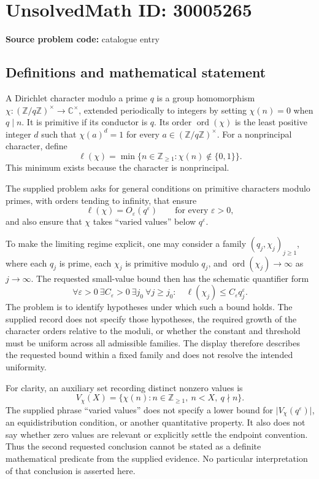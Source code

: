 \documentclass[11pt]{article}
\newcommand{\Z}{\mathbb{Z}}
\newcommand{\C}{\mathbb{C}}
\begin{document}
\section*{UnsolvedMath ID: 30005265}
\textbf{Source problem code:} catalogue entry
\subsection{Definitions and mathematical statement}
A Dirichlet character modulo a prime \(q\) is a group homomorphism \(\chi:(\Z/q\Z)^\times\to\C^\times\), extended periodically to integers by setting \(\chi(n)=0\) when \(q\mid n\). It is primitive if its conductor is \(q\). Its order \(\operatorname{ord}(\chi)\) is the least positive integer \(d\) such that \(\chi(a)^d=1\) for every \(a\in(\Z/q\Z)^\times\). For a nonprincipal character, define
\[
\ell(\chi)=\min\{n\in\Z_{\geq1}:\chi(n)\notin\{0,1\}\}.
\]
This minimum exists because the character is nonprincipal.

The supplied problem asks for general conditions on primitive characters modulo primes, with orders tending to infinity, that ensure
\[
\ell(\chi)=O_{\varepsilon}(q^{\varepsilon})
\qquad\text{for every }\varepsilon>0,
\]
and also ensure that \(\chi\) takes ``varied values'' below \(q^{\varepsilon}\).

To make the limiting regime explicit, one may consider a family \((q_j,\chi_j)_{j\geq1}\), where each \(q_j\) is prime, each \(\chi_j\) is primitive modulo \(q_j\), and \(\operatorname{ord}(\chi_j)\to\infty\) as \(j\to\infty\). The requested small-value bound then has the schematic quantifier form
\[
\forall\varepsilon>0\ \exists C_{\varepsilon}>0\ \exists j_0\
\forall j\geq j_0:\quad
\ell(\chi_j)\leq C_{\varepsilon}q_j^{\varepsilon}.
\]
The problem is to identify hypotheses under which such a bound holds. The supplied record does not specify those hypotheses, the required growth of the character orders relative to the moduli, or whether the constant and threshold must be uniform across all admissible families. The display therefore describes the requested bound within a fixed family and does not resolve the intended uniformity.

For clarity, an auxiliary set recording distinct nonzero values is
\[
V_{\chi}(X)=\{\chi(n):n\in\Z_{\geq1},\ n<X,\ q\nmid n\}.
\]
The supplied phrase ``varied values'' does not specify a lower bound for \(\lvert V_{\chi}(q^{\varepsilon})\rvert\), an equidistribution condition, or another quantitative property. It also does not say whether zero values are relevant or explicitly settle the endpoint convention. Thus the second requested conclusion cannot be stated as a definite mathematical predicate from the supplied evidence. No particular interpretation of that conclusion is asserted here.
\end{document}
